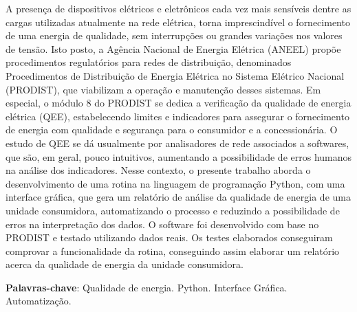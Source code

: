 \begin{resumo}[RESUMO]
  \begin{SingleSpacing}
    A presença de dispositivos elétricos e eletrônicos cada vez mais sensíveis dentre as cargas utilizadas atualmente na rede elétrica, torna imprescindível o fornecimento de uma energia de qualidade, sem interrupções ou grandes variações nos valores de tensão. Isto posto, a Agência Nacional de Energia Elétrica (ANEEL) propõe procedimentos regulatórios para redes de distribuição, denominados Procedimentos de Distribuição de Energia Elétrica no Sistema Elétrico Nacional (PRODIST), que viabilizam a operação e manutenção desses sistemas. Em especial, o módulo 8 do PRODIST se dedica a verificação da qualidade de energia elétrica (QEE), estabelecendo limites e indicadores para assegurar o fornecimento de energia com qualidade e segurança para o consumidor e a concessionária. O estudo de QEE se dá usualmente por analisadores de rede associados a softwares, que são, em geral, pouco intuitivos, aumentando a possibilidade de erros humanos na análise dos indicadores. Nesse contexto, o presente trabalho aborda o desenvolvimento de uma rotina na linguagem de programação Python, com uma interface gráfica, que gera um relatório de análise da qualidade de energia de uma unidade consumidora, automatizando o processo e reduzindo a possibilidade de erros na interpretação dos dados. O software foi desenvolvido com base no PRODIST e testado utilizando dados reais. Os testes elaborados conseguiram comprovar a funcionalidade da rotina, conseguindo assim elaborar um relatório acerca da qualidade de energia da unidade consumidora.
  \end{SingleSpacing}

  \vspace{\onelineskip}
  \textbf{Palavras-chave}: Qualidade de energia. Python. Interface Gráfica. Automatização.
\end{resumo}
